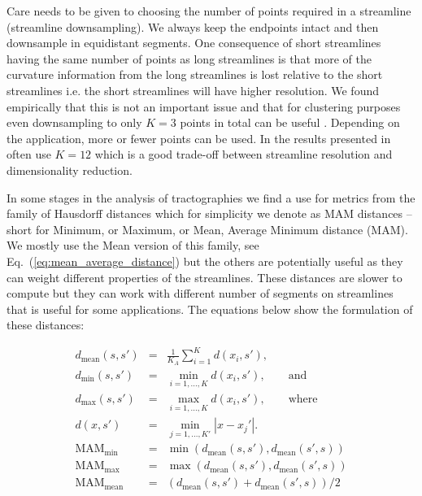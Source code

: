 \documentclass{bioinfo}
\begin{document}
\begin{methods}
Care needs to be given to choosing the number of points required in a
streamline (streamline downsampling). We always keep the endpoints
intact and then downsample in equidistant segments. One consequence of
short streamlines having the same number of points as long streamlines
is that more of the curvature information from the long streamlines is
lost relative to the short streamlines i.e. the short streamlines will
have higher resolution.  We found empirically that this is not an
important issue and that for clustering purposes even downsampling to
only $K=3$ points in total can be useful \cite{EGMB10}. Depending on the
application, more or fewer points can be used. In the results presented
in often use $K=12$ which is a good trade-off between streamline
resolution and dimensionality reduction.

In some stages in the analysis of tractographies we find a use for
metrics from the family of Hausdorff distances which for simplicity we
denote as MAM distances -- short for Minimum, or Maximum, or Mean,
Average Minimum distance (MAM). We mostly use the Mean version of this
family, see Eq.~(\ref{eq:mean_average_distance}) but the others are
potentially useful as they can weight different properties of the
streamlines. These distances are slower to compute but they can work
with different number of segments on streamlines that is useful for some
applications. The equations below show the formulation of these
distances:

\begin{eqnarray}
d_{\textrm{mean}}(s,s') & = & \frac{1}{K_{A}}\sum_{i=1}^{K}d(x_{i},s'),\nonumber \\
d_{\textrm{min}}(s,s') & = & \min_{i=1,...,K}d(x_{i},s'),\qquad\textrm{and}\label{eq:minimum_distance}\\
d_{\textrm{max}}(s,s') & = & \max_{i=1,...,K }d(x_{i},s'),\qquad\textrm{where}\label{eq:maximum distance}\\
d(x,s') & = & \min_{j=1,...,K'}|x-x_{j}'|.\nonumber \\
\textrm{MAM}_{\textrm{min}} & = & \min(d_{\textrm{mean}}(s,s'),d_{\textrm{mean}}(s',s))\label{eq:min_average_distance}\\
\textrm{MAM}_{\textrm{max}} & = & \max(d_{\textrm{mean}}(s,s'),d_{\textrm{mean}}(s',s))\nonumber \\
\textrm{MAM}_{\textrm{mean}} & = & (d_{\textrm{mean}}(s,s')+d_{\textrm{mean}}(s',s))/2\label{eq:mean_average_distance}\end{eqnarray}



\end{methods}
\end{document}
